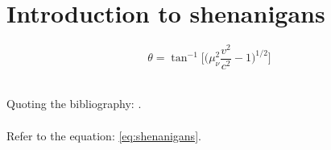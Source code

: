 \documentclass[main.tex]{subfiles}
\begin{document}
\label{sec:intro}

\begin{chapabstract}
\small{\lipsum[1]}\\

\begin{center}
    \noindent\makebox[0.8\linewidth]{\rule{0.8\paperwidth}{0.4pt}}
\end{center}
\vspace{2cm}
\end{chapabstract}

\lipsum[2]

\section{Introduction to shenanigans}
\label{sec:shenanigans}
\lipsum[3]
\lipsum[4]

\begin{equation}
    \theta = \tan^{-1} \Big[\Big(\mu_{\nu}^2 \frac{v^2}{c^2} -1 \Big)^{1/2}\Big]
\label{eq:shenanigans}
\end{equation}

\lipsum[5]\\


Quoting the bibliography: \cite{keyword}.\\


\lipsum[6]\\

Refer to the equation: \ref{eq:shenanigans}.\\

\lipsum[7]
\end{document}
